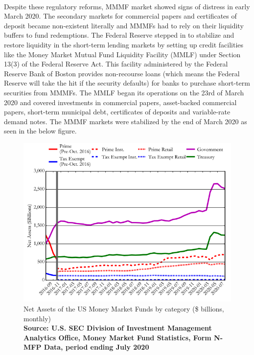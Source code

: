 \documentclass[11pt]{article}
\begin{document}
\paragraph{} Despite these regulatory reforms, MMMF market showed signs of distress in early March 2020. The secondary markets for commercial papers and certificates of deposit became non-existent literally and MMMFs had to rely on their liquidity buffers to fund redemptions. The Federal Reserve stepped in to stabilize and restore liquidity in the short-term lending markets by setting up credit facilities like the Money Market Mutual Fund Liquidity Facility (MMLF) under Section 13(3) of the Federal Reserve Act. This facility administered by the Federal Reserve Bank of Boston provides non-recourse loans (which means the Federal Reserve will take the hit if the security defaults) for banks to purchase short-term securities from MMMFs. The MMLF began its operations on the 23rd of March 2020 and covered investments in commercial papers, asset-backed commercial papers, short-term municipal debt, certificates of deposits and variable-rate demand notes. The MMMF markets were stabilized by the end of March 2020 as seen in the below figure.

\begin{figure}[!htb]
\centerline{\includegraphics[width=6in]{fig2.png}}
\caption{Net Assets of the US Money Market Funds by category (\$ billions, monthly)\\
\textbf{Source: U.S. SEC Division of Investment Management Analytics Office, Money Market Fund Statistics, Form N-MFP Data, period ending July 2020}}
\label{fig:2}
\end{figure}
\end{document}
